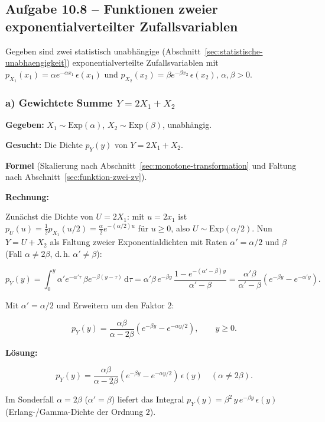 \subsection*{Aufgabe 10.8 – Funktionen zweier exponentialverteilter Zufallsvariablen}

Gegeben sind zwei statistisch unabhängige
(Abschnitt~\ref{sec:statistische-unabhaengigkeit}) exponentialverteilte
Zufallsvariablen mit
$p_{X_1}(x_1) = \alpha e^{-\alpha x_1}\,\epsilon(x_1)$ und
$p_{X_2}(x_2) = \beta e^{-\beta x_2}\,\epsilon(x_2)$, $\alpha,\beta > 0$.

\subsubsection*{a) Gewichtete Summe $Y = 2X_1 + X_2$}

\begin{beispiel}[Funktion zweier Zufallsvariablen -- $Y = 2X_1 + X_2$]

\textbf{Gegeben:} $X_1 \sim \text{Exp}(\alpha)$, $X_2 \sim \text{Exp}(\beta)$,
unabhängig.

\textbf{Gesucht:} Die Dichte $p_Y(y)$ von $Y = 2X_1 + X_2$.

\textbf{Formel} (Skalierung nach Abschnitt~\ref{sec:monotone-transformation} und
Faltung nach Abschnitt~\ref{sec:funktion-zwei-zv}).

\textbf{Rechnung:}

Zunächst die Dichte von $U = 2X_1$: mit $u = 2x_1$ ist
$p_U(u) = \tfrac12 p_{X_1}(u/2) = \tfrac{\alpha}{2} e^{-(\alpha/2)u}$ für
$u \geq 0$, also $U \sim \text{Exp}(\alpha/2)$. Nun $Y = U + X_2$ als Faltung
zweier Exponentialdichten mit Raten $\alpha' = \alpha/2$ und $\beta$
(Fall $\alpha \neq 2\beta$, d.\,h. $\alpha' \neq \beta$):

$$
p_Y(y) = \int_0^{y} \alpha' e^{-\alpha'\tau}\,\beta e^{-\beta(y-\tau)}\,\mathrm{d}\tau
= \alpha'\beta\, e^{-\beta y}\,\frac{1 - e^{-(\alpha'-\beta)y}}{\alpha'-\beta}
= \frac{\alpha'\beta}{\alpha'-\beta}\left(e^{-\beta y} - e^{-\alpha' y}\right).
$$

Mit $\alpha' = \alpha/2$ und Erweitern um den Faktor $2$:

$$
p_Y(y) = \frac{\alpha\beta}{\alpha - 2\beta}
\left(e^{-\beta y} - e^{-\alpha y/2}\right), \qquad y \geq 0.
$$

\textbf{Lösung:}

$$
\boxed{\;p_Y(y) = \frac{\alpha\beta}{\alpha - 2\beta}
\left(e^{-\beta y} - e^{-\alpha y/2}\right)\,\epsilon(y)
\quad (\alpha \neq 2\beta).\;}
$$

Im Sonderfall $\alpha = 2\beta$ ($\alpha' = \beta$) liefert das Integral
$p_Y(y) = \beta^2\, y\, e^{-\beta y}\,\epsilon(y)$ (Erlang-/Gamma-Dichte der
Ordnung $2$).

\end{beispiel}

